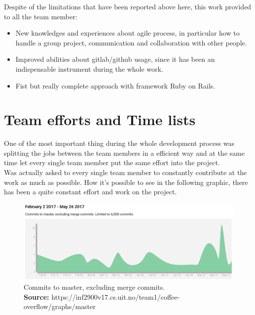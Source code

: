 Despite of the limitations that have been reported above here, this work provided to all the team member:
\vspace{-5mm}
\begin{itemize}
 \setlength{\itemsep}{-5pt}
\item New knowledges and experiences about agile process, in particular how to handle a group project, communication and collaboration with other people.
\item Improved abilities about gitlab/github usage, since it has been an indispensable instrument during the whole work.
\item Fist but really complete approach with framework Ruby on Rails.
\end{itemize}



\section{Team efforts and Time lists}
One of the most important thing during the whole development process was splitting the jobs between the team members in a efficient way and at the same time let every single team member put the same effort into the project.\\
Was actually asked to every single team member to constantly contribute at the work as much as possible. How it's possible to see in the following graphic, there has been a quite constant effort and work on the project.
\begin{figure}[H]
	\centering
    \includegraphics[trim={0 0 0 0},clip,width=1\textwidth]{Files/commitsToMaster.png}
    \caption{Commits to master, excluding merge commits.\\ \textbf{Source:} https://inf2900v17.cs.uit.no/team1/coffee-overflow/graphs/master}
    \label{fig: MVC}
\end{figure}


